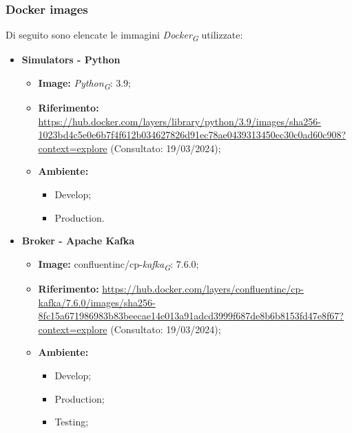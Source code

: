 \subsubsection{Docker images}

Di seguito sono elencate le immagini \textit{Docker}\textsubscript{\textit{G}} utilizzate:

\begin{itemize}

  \item \textbf{Simulators - Python} 
    \begin{itemize}
      \item \textbf{Image:} \textit{Python}\textsubscript{\textit{G}}: 3.9;
      \item \textbf{Riferimento:} \url{https://hub.docker.com/layers/library/python/3.9/images/sha256-1023bd4c5e0e6b7f4f612b034627826d91ec78ae0439313450ec30c0ad60c908?context=explore} (Consultato: 19/03/2024);
      \item \textbf{Ambiente:}
        \begin{itemize}
          \item Develop;
          \item Production.
        \end{itemize}
    \end{itemize}

  \item \textbf{Broker - Apache Kafka} 
    \begin{itemize}
      \item \textbf{Image:} confluentinc/cp-\textit{kafka}\textsubscript{\textit{G}}: 7.6.0;
      \item \textbf{Riferimento:} \url{https://hub.docker.com/layers/confluentinc/cp-kafka/7.6.0/images/sha256-8fc15a671986983b83beecae14e013a91adcd3999f687de8b6b8153fd47e8f67?context=explore} (Consultato: 19/03/2024);
      \item \textbf{Ambiente:}
        \begin{itemize}
          \item Develop;
          \item Production;
          \item Testing;
        \end{itemize}
    \end{itemize}


\end{itemize}
